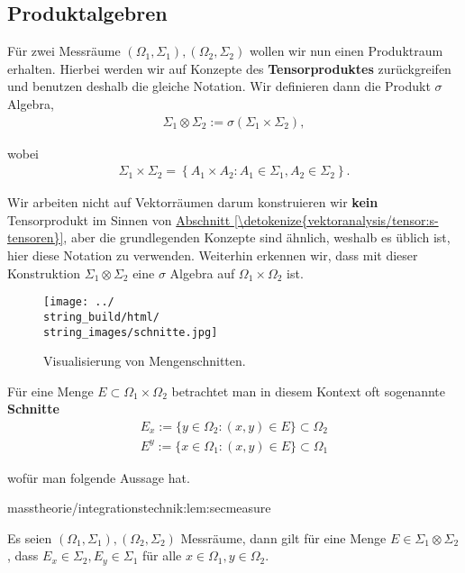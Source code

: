 \subsection{Produktalgebren}
\label{\detokenize{masstheorie/integrationstechnik:produktalgebren}}
\par
Für zwei Messräume \((\Omega_1,\Sigma_1), (\Omega_2,\Sigma_2)\) wollen wir nun einen Produktraum erhalten. Hierbei werden wir auf Konzepte des \textbf{Tensorproduktes} zurückgreifen und benutzen deshalb die gleiche Notation. Wir definieren dann die Produkt \(\sigma\) Algebra,
\begin{align*}
\Sigma_1\otimes\Sigma_2 := \sigma\left(\Sigma_1\times\Sigma_2\right),
\end{align*}
\par
wobei
\begin{align*}
\Sigma_1\times\Sigma_2 = \left\{A_1\times A_2: A_1\in\Sigma_1, A_2\in\Sigma_2\right\}.
\end{align*}
\par
Wir arbeiten nicht auf Vektorräumen darum konstruieren wir \textbf{kein} Tensorprodukt im Sinnen von \hyperref[\detokenize{vektoranalysis/tensor:s-tensoren}]{Abschnitt \ref{\detokenize{vektoranalysis/tensor:s-tensoren}}}, aber die grundlegenden Konzepte sind ähnlich, weshalb es üblich ist, hier diese Notation zu verwenden. Weiterhin erkennen wir, dass mit dieser Konstruktion \(\Sigma_1\otimes\Sigma_2 \) eine \(\sigma\) Algebra auf \(\Omega_1\times\Omega_2\) ist.

\begin{figure}[htbp]
\centering


\noindent\texttt{[image: ../\\string\_build/html/\\string\_images/schnitte.jpg]}
\caption{Visualisierung von Mengenschnitten.}\label{\detokenize{masstheorie/integrationstechnik:fig-schnitte}}\end{figure}

\par
Für eine Menge \(E\subset\Omega_1\times\Omega_2\) betrachtet man in diesem Kontext oft sogenannte \textbf{Schnitte}
\begin{align*}
E_x := \{y\in \Omega_2: (x,y)\in E\}\subset\Omega_2\\
E^y := \{x\in \Omega_1: (x,y)\in E\}\subset\Omega_1
\end{align*}
\par
wofür man folgende Aussage hat.
\begin{lemma}{}{masstheorie/integrationstechnik:lem:secmeasure}



\par
Es seien \((\Omega_1,\Sigma_1), (\Omega_2,\Sigma_2)\) Messräume, dann gilt für eine Menge \(E\in \Sigma_1\otimes\Sigma_2\), dass \(E_x\in \Sigma_2, E_y\in\Sigma_1\) für alle \(x\in\Omega_1,y\in\Omega_2\).
\end{lemma}

